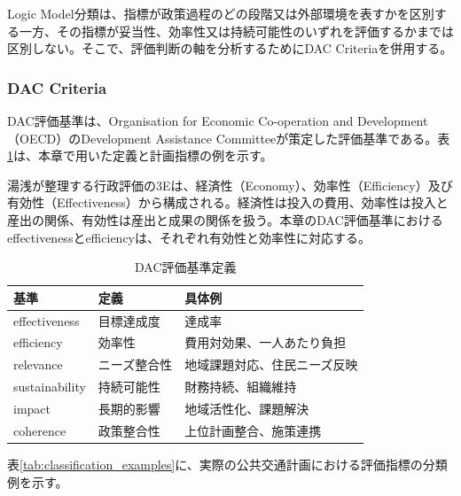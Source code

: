 Logic Model分類は、指標が政策過程のどの段階又は外部環境を表すかを区別する一方、その指標が妥当性、効率性又は持続可能性のいずれを評価するかまでは区別しない。そこで、評価判断の軸を分析するためにDAC Criteriaを併用する。

\subsubsection{DAC Criteria}

DAC評価基準は、Organisation for Economic Co-operation and Development（OECD）のDevelopment Assistance Committeeが策定した評価基準である\cite{oecd2021}。表\ref{tab:dac_criteria}は、本章で用いた定義と計画指標の例を示す。

湯浅\cite{yuasa2021}が整理する行政評価の3Eは、経済性（Economy）、効率性（Efficiency）及び有効性（Effectiveness）から構成される。経済性は投入の費用、効率性は投入と産出の関係、有効性は産出と成果の関係を扱う。本章のDAC評価基準におけるeffectivenessとefficiencyは、それぞれ有効性と効率性に対応する。

\begin{table}[htbp]
\caption{DAC評価基準定義}
\label{tab:dac_criteria}
\centering
\begin{tabular}{llp{5cm}}
\toprule
基準 & 定義 & 具体例 \\
\midrule
effectiveness & 目標達成度 & 達成率 \\
efficiency & 効率性 & 費用対効果、一人あたり負担 \\
relevance & ニーズ整合性 & 地域課題対応、住民ニーズ反映 \\
sustainability & 持続可能性 & 財務持続、組織維持 \\
impact & 長期的影響 & 地域活性化、課題解決 \\
coherence & 政策整合性 & 上位計画整合、施策連携 \\
\bottomrule
\end{tabular}
\end{table}

表\ref{tab:classification_examples}に、実際の公共交通計画における評価指標の分類例を示す。


